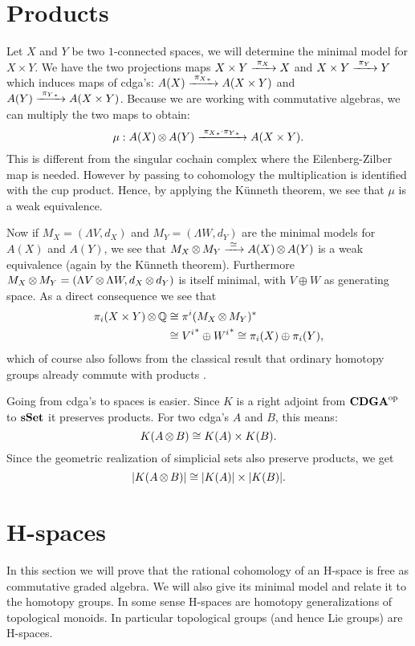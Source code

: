 \section{Products}
Let $X$ and $Y$ be two $1$-connected spaces, we will determine the minimal model for $X \times Y$. We have the two projections maps $X \times Y \xrightarrow{\,\,{\pi_X}\,\,} X$ and $X \times Y \xrightarrow{\,\,{\pi_Y}\,\,} Y$ which induces maps of cdga's: $A(X) \xrightarrow{\,\,{{\pi_X}_\ast}\,\,} A(X \times Y)$ and $A(Y) \xrightarrow{\,\,{{\pi_Y}_\ast}\,\,} A(X \times Y)$. Because we are working with commutative algebras, we can multiply the two maps to obtain:
$$ \mu: A(X) \operatorname*{\otimes} A(Y) \xrightarrow{\,\,{{\pi_X}_\ast \cdot {\pi_Y}_\ast}\,\,} A(X \times Y). $$
This is different from the singular cochain complex where the Eilenberg-Zilber map is needed. However by passing to cohomology the multiplication is identified with the cup product. Hence, by applying the Künneth theorem, we see that $\mu$ is a weak equivalence.

Now if $M_X = (\Lambda V, d_X)$ and $M_Y = (\Lambda W, d_Y)$ are the minimal models for $A(X)$ and $A(Y)$, we see that $M_X \operatorname*{\otimes} M_Y \xrightarrow{\,\,{\simeq}\,\,} A(X) \operatorname*{\otimes} A(Y)$ is a weak equivalence (again by the Künneth theorem). Furthermore $M_X \operatorname*{\otimes} M_Y = (\Lambda V \operatorname*{\otimes} \Lambda W, d_X \operatorname*{\otimes} d_Y)$ is itself minimal, with $V \oplus W$ as generating space. As a direct consequence we see that
\begin{align*}
	\pi_i(X \times Y) \operatorname*{\otimes} \mathbb{Q} &\cong \pi^i(M_X \operatorname*{\otimes} M_Y)^\ast \\
		&\cong {V^i}^\ast \oplus {W^i}^\ast \cong \pi_i(X) \oplus \pi_i(Y),
\end{align*}
which of course also follows from the classical result that ordinary homotopy groups already commute with products \cite{may}.

Going from cdga's to spaces is easier. Since $K$ is a right adjoint from ${\mathbf{CDGA}}^{\text{op}}$ to $\mathbf{s{\mathbf{Set}}}$ it preserves products. For two cdga's $A$ and $B$, this means:
$$ K(A \operatorname*{\otimes} B) \cong K(A) \times K(B). $$
Since the geometric realization of simplicial sets also preserve products, we get
$$ |K(A \operatorname*{\otimes} B)| \cong |K(A)| \times |K(B)|. $$


\section{H-spaces}
In this section we will prove that the rational cohomology of an H-space is free as commutative graded algebra. We will also give its minimal model and relate it to the homotopy groups. In some sense H-spaces are homotopy generalizations of topological monoids. In particular topological groups (and hence Lie groups) are H-spaces.

